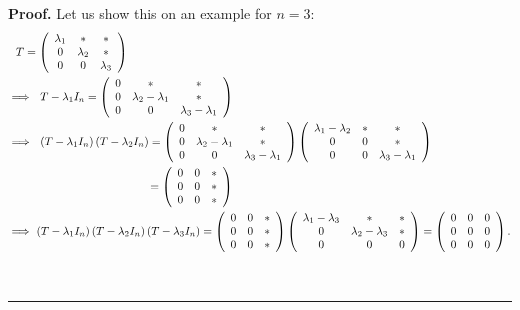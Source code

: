 \documentclass[numbers=enddot,12pt,final,onecolumn,notitlepage]{scrartcl}%
\numberwithin{exer}{subsection}
\theoremstyle{definition}
\newenvironment{proof}[1][Proof]{\noindent\textbf{#1.} }{\ \rule{0.5em}{0.5em}}
\begin{document}
\begin{proof}
Let us show this on an example for $n=3$:%
\begin{align*}
& \ \ T=\left(
\begin{array}
[c]{ccc}%
\lambda_{1} & \ast & \ast\\
0 & \lambda_{2} & \ast\\
0 & 0 & \lambda_{3}%
\end{array}
\right)  \\
& \Longrightarrow\ \text{\ }T-\lambda_{1}I_{n}=\left(
\begin{array}
[c]{ccc}%
0 & \ast & \ast\\
0 & \lambda_{2}-\lambda_{1} & \ast\\
0 & 0 & \lambda_{3}-\lambda_{1}%
\end{array}
\right)  \\
& \Longrightarrow\ \ \left(  T-\lambda_{1}I_{n}\right)  \left(  T-\lambda
_{2}I_{n}\right)  =\left(
\begin{array}
[c]{ccc}%
0 & \ast & \ast\\
0 & \lambda_{2}-\lambda_{1} & \ast\\
0 & 0 & \lambda_{3}-\lambda_{1}%
\end{array}
\right)  \left(
\begin{array}
[c]{ccc}%
\lambda_{1}-\lambda_{2} & \ast & \ast\\
0 & 0 & \ast\\
0 & 0 & \lambda_{3}-\lambda_{1}%
\end{array}
\right)  \\
&
\ \ \ \ \ \ \ \ \ \ \ \ \ \ \ \ \ \ \ \ \ \ \ \ \ \ \ \ \ \ \ \ \ \ \ \ \ =\left(
%
\begin{array}
[c]{ccc}%
0 & 0 & \ast\\
0 & 0 & \ast\\
0 & 0 & \ast
\end{array}
\right)  \\
& \Longrightarrow\ \left(  T-\lambda_{1}I_{n}\right)  \left(  T-\lambda
_{2}I_{n}\right)  \left(  T-\lambda_{3}I_{n}\right)  =\left(
\begin{array}
[c]{ccc}%
0 & 0 & \ast\\
0 & 0 & \ast\\
0 & 0 & \ast
\end{array}
\right)  \left(
\begin{array}
[c]{ccc}%
\lambda_{1}-\lambda_{3} & \ast & \ast\\
0 & \lambda_{2}-\lambda_{3} & \ast\\
0 & 0 & 0
\end{array}
\right)  =\left(
\begin{array}
[c]{ccc}%
0 & 0 & 0\\
0 & 0 & 0\\
0 & 0 & 0
\end{array}
\right)  .
\end{align*}



\end{proof}
\end{document}
